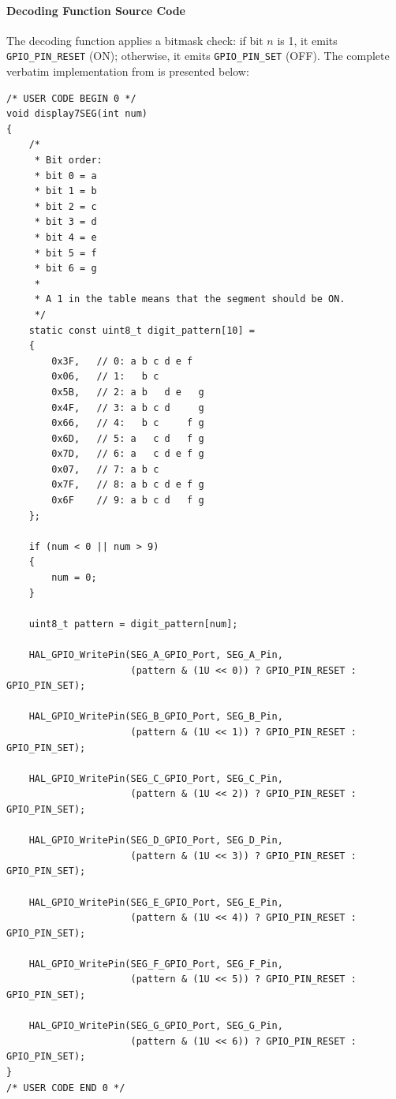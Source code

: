 \documentclass[oneside,final]{hcmut-report}
\begin{document}
\paragraph{Decoding Function Source Code}
The decoding function applies a bitmask check: if bit $n$ is 1, it emits \texttt{GPIO\_PIN\_RESET} (ON); otherwise, it emits \texttt{GPIO\_PIN\_SET} (OFF). The complete verbatim implementation from  is presented below:

\begin{lstlisting}[caption={[display7SEG() function]{Complete display7SEG(int num) implementation (Lab1\_e4/Core/Src/main.c)}},label={lst:ex4_func},basicstyle=\fontsize{7.6pt}{8.6pt}\ttfamily,lineskip=0pt,aboveskip=2pt,belowskip=2pt]
/* USER CODE BEGIN 0 */
void display7SEG(int num)
{
    /*
     * Bit order:
     * bit 0 = a
     * bit 1 = b
     * bit 2 = c
     * bit 3 = d
     * bit 4 = e
     * bit 5 = f
     * bit 6 = g
     *
     * A 1 in the table means that the segment should be ON.
     */
    static const uint8_t digit_pattern[10] =
    {
        0x3F,   // 0: a b c d e f
        0x06,   // 1:   b c
        0x5B,   // 2: a b   d e   g
        0x4F,   // 3: a b c d     g
        0x66,   // 4:   b c     f g
        0x6D,   // 5: a   c d   f g
        0x7D,   // 6: a   c d e f g
        0x07,   // 7: a b c
        0x7F,   // 8: a b c d e f g
        0x6F    // 9: a b c d   f g
    };

    if (num < 0 || num > 9)
    {
        num = 0;
    }

    uint8_t pattern = digit_pattern[num];

    HAL_GPIO_WritePin(SEG_A_GPIO_Port, SEG_A_Pin,
                      (pattern & (1U << 0)) ? GPIO_PIN_RESET : GPIO_PIN_SET);

    HAL_GPIO_WritePin(SEG_B_GPIO_Port, SEG_B_Pin,
                      (pattern & (1U << 1)) ? GPIO_PIN_RESET : GPIO_PIN_SET);

    HAL_GPIO_WritePin(SEG_C_GPIO_Port, SEG_C_Pin,
                      (pattern & (1U << 2)) ? GPIO_PIN_RESET : GPIO_PIN_SET);

    HAL_GPIO_WritePin(SEG_D_GPIO_Port, SEG_D_Pin,
                      (pattern & (1U << 3)) ? GPIO_PIN_RESET : GPIO_PIN_SET);

    HAL_GPIO_WritePin(SEG_E_GPIO_Port, SEG_E_Pin,
                      (pattern & (1U << 4)) ? GPIO_PIN_RESET : GPIO_PIN_SET);

    HAL_GPIO_WritePin(SEG_F_GPIO_Port, SEG_F_Pin,
                      (pattern & (1U << 5)) ? GPIO_PIN_RESET : GPIO_PIN_SET);

    HAL_GPIO_WritePin(SEG_G_GPIO_Port, SEG_G_Pin,
                      (pattern & (1U << 6)) ? GPIO_PIN_RESET : GPIO_PIN_SET);
}
/* USER CODE END 0 */
\end{lstlisting}
\clearpage
\restoregeometry
\end{document}

